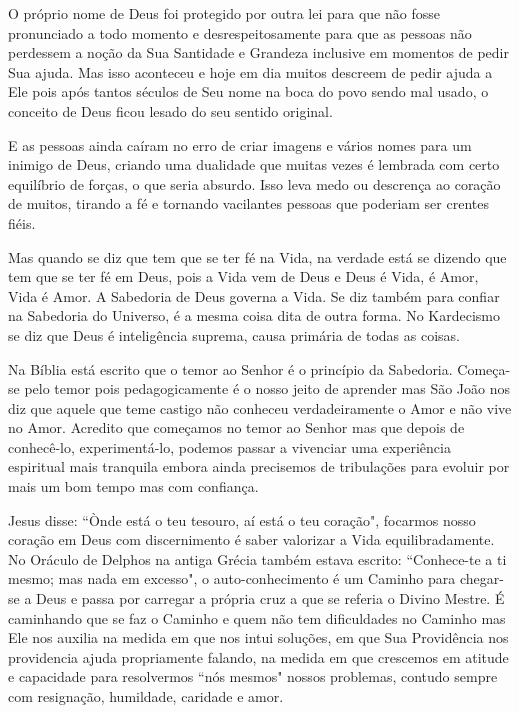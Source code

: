 \emdash{}O próprio nome de Deus foi protegido por outra lei para que não fosse pronunciado a todo momento e desrespeitosamente para que as pessoas não perdessem a noção da Sua Santidade e Grandeza inclusive em momentos de pedir Sua ajuda. Mas isso aconteceu e hoje em dia muitos descreem de pedir ajuda a Ele pois após tantos séculos de Seu nome na boca do povo sendo mal usado, o conceito de Deus ficou lesado do seu sentido original.

\emdash{}E as pessoas ainda caíram no erro de criar imagens e vários nomes para um inimigo de Deus, criando uma dualidade que muitas vezes é lembrada com certo equilíbrio de forças, o que seria absurdo. Isso leva medo ou descrença ao coração de muitos, tirando a fé e tornando vacilantes pessoas que poderiam ser crentes fiéis.

\emdash{}Mas quando se diz que tem que se ter fé na Vida, na verdade está se dizendo que tem que se ter fé em Deus, pois a Vida vem de Deus e Deus é Vida, é Amor, Vida é Amor. A Sabedoria de Deus governa a Vida. Se diz também para confiar na Sabedoria do Universo, é a mesma coisa dita de outra forma. No Kardecismo se diz que Deus é inteligência suprema, causa primária de todas as coisas. 

\emdash{}Na Bíblia está escrito que o temor ao Senhor é o princípio da Sabedoria. Começa-se pelo temor pois pedagogicamente é o nosso jeito de aprender mas São João nos diz que aquele que teme castigo não conheceu verdadeiramente o Amor e não vive no Amor. Acredito que começamos no temor ao Senhor mas que depois de conhecê-lo, experimentá-lo, podemos passar a vivenciar uma experiência espiritual mais tranquila embora ainda precisemos de tribulações para evoluir por mais um bom tempo mas com confiança.

\emdash{}Jesus disse: ``Ònde está o teu tesouro, aí está o teu coração", focarmos nosso coração em Deus com discernimento é saber valorizar a Vida equilibradamente. No Oráculo de Delphos na antiga Grécia também estava escrito: ``Conhece-te a ti mesmo; mas nada em excesso", o auto-conhecimento é um Caminho para chegar-se a Deus e passa por carregar a própria cruz a que se referia o Divino Mestre. É caminhando que se faz o Caminho e quem não tem dificuldades no Caminho mas Ele nos auxilia na medida em que nos intui soluções, em que Sua Providência nos providencia ajuda propriamente falando, na medida em que crescemos em atitude e capacidade para resolvermos ``nós mesmos" nossos problemas, contudo sempre com resignação, humildade, caridade e amor.